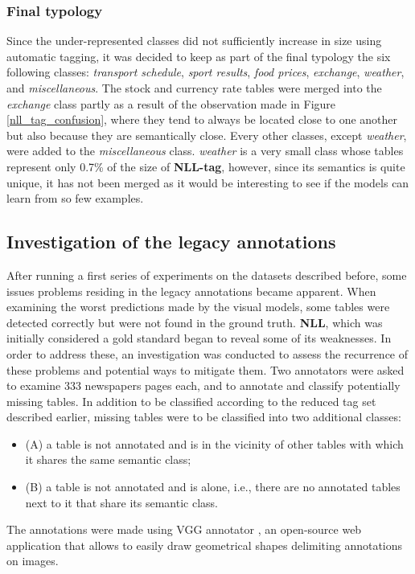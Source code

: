 \subsubsection{Final typology}
Since the under-represented classes did not sufficiently increase in size using automatic tagging, it was decided to keep as part of the final typology the six following classes: \textit{transport schedule}, \textit{sport results}, \textit{food prices}, \textit{exchange}, \textit{weather}, and \textit{miscellaneous}. The stock and currency rate tables were merged into the \textit{exchange} class partly as a result of the observation made in Figure \ref{nll_tag_confusion}, where they tend to always be located close to one another but also because they are semantically close. Every other classes, except \textit{weather}, were added to the \textit{miscellaneous} class. \textit{weather} is a very small class whose tables represent only 0.7\% of the size of \textbf{NLL-tag}, however, since its semantics is quite unique, it has not been merged as it would be interesting to see if the models can learn from so few examples.

\subsection{Investigation of the legacy annotations}
\label{annotation_survey}
After running a first series of experiments on the datasets described before, some issues problems residing in the legacy annotations became apparent. When examining the worst predictions made by the visual models, some tables were detected correctly but were not found in the ground truth. \textbf{NLL}, which was initially considered a gold standard began to reveal some of its weaknesses. In order to address these, an investigation was conducted to assess the recurrence of these problems and potential ways to mitigate them. Two annotators were asked to examine 333 newspapers pages each, and to annotate and classify potentially missing tables. In addition to be classified according to the reduced tag set described earlier, missing tables were to be classified into two additional classes:
\begin{itemize}
\item (A) a table is not annotated and is in the vicinity of other tables with which it shares the same semantic class;
\item (B) a table is not annotated and is alone, i.e., there are no annotated tables next to it that share its semantic class.
\end{itemize}
The annotations were made using VGG annotator \cite{dutta_via_2019}, an open-source web application that allows to easily draw geometrical shapes delimiting annotations on images.

